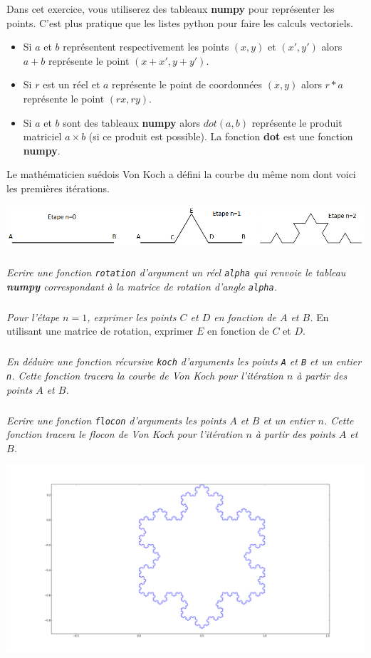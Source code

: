 Dans cet exercice, vous utiliserez des tableaux \textbf{numpy} pour représenter les points. C'est plus pratique que les 
listes python pour faire les calculs vectoriels.

\begin{itemize}
\item Si $a$ et $b$ représentent respectivement les points $(x,y)$ et $(x',y')$ alors $a+b$ représente le point 
$(x+x',y+y')$.
\item Si $r$ est un réel et $a$ représente le point de coordonnées $(x,y)$ alors $r*a$ représente le point $(rx,ry)$.
\item Si $a$ et $b$ sont des tableaux \textbf{numpy} alors $dot(a,b)$ représente le produit matriciel $a\times b$ (si ce 
produit est possible). La fonction \textbf{dot} est une fonction \textbf{numpy}.
\end{itemize}

Le mathématicien suédois Von Koch a défini la courbe du même nom dont voici les premières itérations.

\begin{center}
\includegraphics[width=.95\linewidth]{images/etapes_flocon}
\end{center}

\subparagraph{}
\textit{Ecrire une fonction \texttt{rotation} d'argument un réel \texttt{alpha} qui renvoie le tableau \textbf{numpy} 
correspondant à la matrice de rotation d'angle \texttt{alpha}.}

\subparagraph{}
\textit{Pour l'étape $n=1$, exprimer les points $C$ et $D$ en fonction de $A$ et $B$.}
En utilisant une matrice de rotation, exprimer $E$ en fonction de $C$ et $D$.

\subparagraph{}
\textit{En déduire une fonction récursive \texttt{koch} d'arguments les points \texttt{A} et \texttt{B} et un entier 
\texttt{n}. Cette fonction tracera la courbe de Von Koch pour l'itération $n$ à partir des points $A$ et $B$.}

\subparagraph{}
\textit{Ecrire une fonction \texttt{flocon} d'arguments les points $A$ et $B$ et un entier $n$. Cette fonction tracera 
le flocon de Von Koch pour l'itération $n$ à partir des points $A$ et $B$.}

\begin{center}
\includegraphics[width=.95\linewidth]{images/flocon_von_koch}
\end{center}


